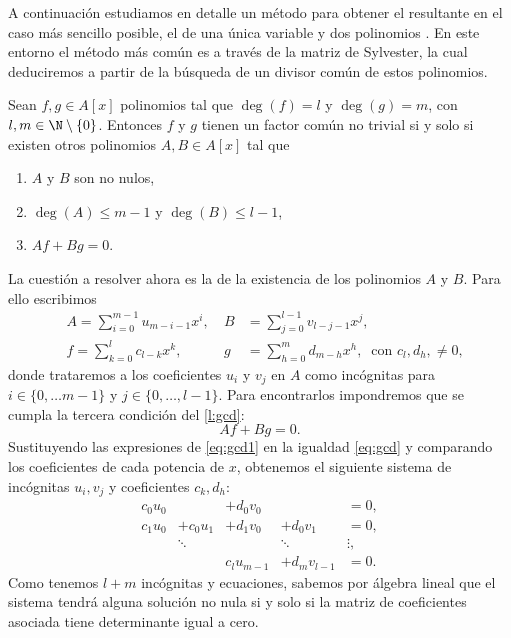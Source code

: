 A continuación estudiamos en detalle un método para obtener el resultante en el caso más sencillo posible, el de una única variable y dos polinomios \cite{ideals_varieties}. En este entorno el método más común es a través de la matriz de Sylvester, la cual deduciremos a partir de la búsqueda de un divisor común de estos polinomios.
\begin{lema}\label{l:gcd}
    Sean $f,g\in A[x]$ polinomios tal que $\deg(f) = l$ y $\deg(g) = m$, con $l,m \in \N\setminus \{0\}$. Entonces $f$ y $g$ tienen un factor común no trivial si y solo si existen otros polinomios $A,B \in A[x]$ tal que
    \begin{enumerate}
        \item $A$ y $B$ son no nulos,
        \item $\deg(A)\le m-1$ y $\deg(B)\le l-1$,
        \item $Af+Bg = 0$.
    \end{enumerate}
\end{lema}
La cuestión a resolver ahora es la de la existencia de los polinomios $A$ y $B$. Para ello escribimos
\begin{align}\label{eq:gcd1}
    &A = \sum_{i=0}^{m-1} u_{m-i-1} x^i,   \ &B &= \sum_{j=0}^{l-1} v_{l-j-1} x^j,\\
    &f = \sum_{k=0}^l c_{l-k} x^k,         \ &g &= \sum_{h=0}^m d_{m-h} x^h,\ \text{ con } c_l, d_h,\neq 0,
\end{align}
donde trataremos a los coeficientes $u_i$ y $v_j$ en $A$ como incógnitas para $i\in\{0,\dots m-1\}$ y $j\in \{0,\dots, l-1\}$. Para encontrarlos impondremos que se cumpla la tercera condición del \autoref{l:gcd}:
\begin{equation}\label{eq:gcd}
Af + Bg = 0.    
\end{equation}
Sustituyendo las expresiones de \eqref{eq:gcd1} en la igualdad \eqref{eq:gcd} y comparando los coeficientes de cada potencia de $x$, obtenemos el siguiente sistema de incógnitas $u_i,v_j$ y coeficientes $c_k,d_h$:
\begin{align*}
    c_0u_0  &              &+ d_0v_0       &                        &= 0,\\
    c_1u_0  &+ c_0u_1&+ d_1v_0       &+ d_0v_1               &= 0,\\
            &\ddots        &               & \ddots                &\vdots,\\
            &              &c_lu_{m-1}     &+          d_mv_{l-1}  &=0.
\end{align*}
Como tenemos $l+m$ incógnitas y ecuaciones, sabemos por álgebra lineal que el sistema tendrá alguna solución no nula si y solo si la matriz de coeficientes asociada tiene determinante igual a cero.
